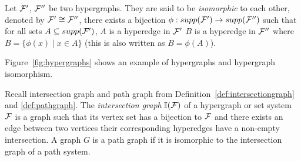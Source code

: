 \begin{definition}
  \label{def:hisomorph}
  Let ${\cal F}'$, ${\cal F}''$ be two hypergraphs.  They are said to be {\em
    isomorphic} to each other, denoted by ${\cal F}' \cong {\cal F}''$, \iff
  there exists a bijection $\phi: supp({\cal F}') \rightarrow supp({\cal F}'')$
  such that for all sets $A \subseteq supp({\cal F}')$, $A$ is a hyperedge
  in ${\cal F}'$ \iff $B$ is a hyperedge in ${\cal F}''$ where $B = \{\phi(x)
  \mid x \in A\}$ (this is also written as $B=\phi(A)$).
\end{definition}

Figure~\ref{fig:hypergraphs} shows an example of hypergraphs and
hypergraph isomorphism.

Recall intersection graph and path graph from
Definition~\ref{def:intersectiongraph} and \ref{def:pathgraph}. The
{\em intersection graph} $\mathbb I({\cal F})$ of a hypergraph or set system
${\cal F}$ is a graph such that its vertex set has a bijection to ${\cal F}$ and
there exists an edge between two vertices \iff their corresponding
hyperedges have a non-empty intersection. A graph $G$ is a path graph
if it is isomorphic to the intersection graph of a path system.

